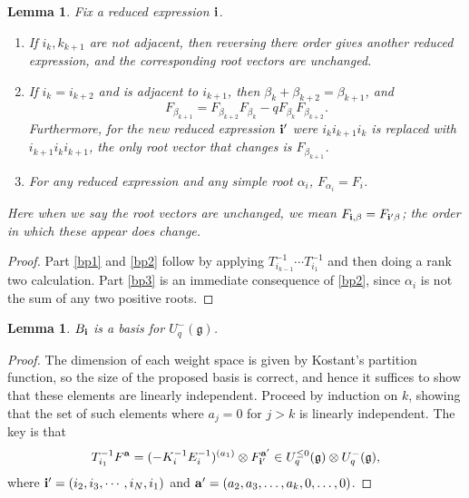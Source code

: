 \documentclass[11pt]{amsart}
\numberwithin{equation}{section}
\newtheorem{Lemma}[Theorem]{Lemma}
\theoremstyle{definition}
\newcommand{\g}{\mathfrak{g}}
\begin{document}
\begin{Lemma} \label{lem:bp} Fix a reduced expression ${\bf i}$. 
\begin{enumerate}

\item \label{bp1} If $i_k, k_{k+1}$ are not adjacent, then reversing there order gives another reduced expression, and the corresponding root vectors are unchanged. 

\item \label{bp2}  If $i_k=i_{k+2}$ and is adjacent to $i_{k+1}$, then $\beta_k+\beta_{k+2}=\beta_{k+1}$, and $$F_{\beta_{k+1}}=  F_{\beta_{k+2}} F_{\beta_k} - q F_{\beta_k} F_{\beta_{k+2}}.$$ Furthermore, for the new reduced expression ${\bf i'}$ were $i_k i_{k+1} i_k$ is replaced with $i_{k+1} i_k i_{k+1}$, the only root vector that changes is $F_{\beta_{k+1}}$.

\item \label{bp3} For any reduced expression and any simple root $\alpha_i$, $F_{\alpha_i}=F_i$.
\end{enumerate}
Here when we say the root vectors are unchanged, we mean $F_{{\bf i}, \beta}=F_{{\bf i'} \beta}$; the order in which these appear does change. 
\end{Lemma}

\begin{proof}
Part \eqref{bp1} and \eqref{bp2} follow by applying $T_{i_{k-1}}^{-1} \cdots T_{i_1}^{-1}$ and then doing a rank two calculation. Part \eqref{bp3} is an immediate consequence of \eqref{bp2}, since $\alpha_i$ is not the sum of any two positive roots. 
\end{proof}

\begin{Lemma}
$B_{\bf i}$ is a basis for $U_q^-(\g)$.
\end{Lemma}

\begin{proof}
The dimension of each weight space is given by Kostant's partition function, so the size of the proposed basis is correct, and hence it suffices to show that these elements are linearly independent. Proceed by induction on $k$, showing that the set of such elements where $a_j=0$ for $j>k$ is linearly independent. The key is that 
$$T_{i_1}^{-1} F^{\bf a}= (- K_i^{-1} E_i^{-1})^{(a_1)} \otimes F_{\bf i'}^{\bf a'} \in  U_q^{\leq 0} (\g) \otimes U_q^-(\g),$$
where ${\bf i'}= (i_2, i_3, \cdots, i_N, i_1)$ and ${\bf a'}= (a_2, a_3, \ldots, a_k, 0, \ldots, 0)$. 
\end{proof}
\end{document}

